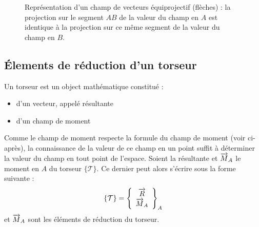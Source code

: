 \begin{figure}[htbp]
	\centering
	\caption{Représentation d'un champ de vecteurs équiprojectif (flèches) : la projection sur le segment $AB$ de la valeur du champ en $A$ est identique à la projection sur ce même segment de la valeur du champ en $B$.}
	\label{fig:equiprojectivite}
\end{figure}

	\subsection{\'Elements de réduction d'un torseur}
	Un torseur est un object mathématique constitué :
	\begin{itemize}
		\item d'un vecteur, appelé résultante
		\item d'un champ de moment
	\end{itemize}
	
	Comme le champ de moment respecte la formule du champ de moment (voir ci-après), la connaissance de la valeur de ce champ en un point suffit à déterminer la valeur du champ en tout point de l'espace. Soient  la résultante et $\overrightarrow{M}_A$ le moment en $A$ du torseur $\lbrace\mathcal{T}\rbrace$. Ce dernier peut alors s'écrire sous la forme suivante :
	\begin{equation}
		\left\lbrace\mathcal{T}\right\rbrace=\left\lbrace\begin{array}{c}
			\overrightarrow{R}\\
			\overrightarrow{M}_A
		\end{array}\right\rbrace_A
	\end{equation}
	 et $\overrightarrow{M}_A$ sont les éléments de réduction du torseur.
	
